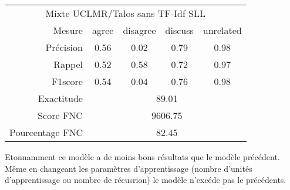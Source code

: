 \documentclass[onecolumn, 12pt]{article}
\begin{document}
\begin{center}
 \begin{tabular}{ r | c c c c }
  \multicolumn{5}{c}{Mixte UCLMR/Talos sans TF-Idf SLL}                          \\
  Mesure          & agree                       & disagree & discuss & unrelated \\
  \hline
  Précision       & 0.56                        & 0.02     & 0.79    & 0.98      \\
  Rappel          & 0.52                        & 0.58     & 0.72    & 0.97      \\
  F1score         & 0.54                        & 0.04     & 0.76    & 0.98      \\
  \hline
  \hline
  Exactitude      & \multicolumn{4}{c}{89.01}                                    \\
  Score FNC       & \multicolumn{4}{c}{9606.75}                                  \\
  Pourcentage FNC & \multicolumn{4}{c}{82.45}                                    \\
 \end{tabular}
\end{center}

Etonnamment ce modèle a de moins bons résultats que le modèle précédent.
Même en changeant les paramètres d'apprentissage (nombre d'unités d'apprentissage ou nombre de récusrion) le modèle n'excéde pas le précédents.
\end{document}
